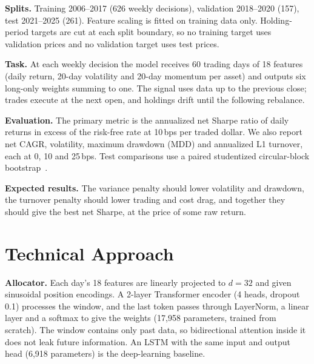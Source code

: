\documentclass[10pt,twocolumn,letterpaper]{article}
\begin{document}
\textbf{Splits.} Training 2006--2017 (626 weekly decisions), validation 2018--2020 (157), test
2021--2025 (261). Feature scaling is fitted on training data only. Holding-period targets are cut
at each split boundary, so no training target uses validation prices and no validation target
uses test prices.

\textbf{Task.} At each weekly decision the model receives 60 trading days of 18 features (daily
return, 20-day volatility and 20-day momentum per asset) and outputs six long-only weights
summing to one. The signal uses data up to the previous close; trades execute at the next
open, and holdings drift until the following rebalance.

\textbf{Evaluation.} The primary metric is the annualized net Sharpe ratio of daily returns in
excess of the risk-free rate at 10\,bps per traded dollar. We also report net CAGR, volatility,
maximum drawdown (MDD) and annualized L1 turnover, each at 0, 10 and 25\,bps. Test
comparisons use a paired studentized circular-block bootstrap~\cite{ledoit2008robust}.

\textbf{Expected results.} The variance penalty should lower volatility and drawdown, the
turnover penalty should lower trading and cost drag, and together they should give the best
net Sharpe, at the price of some raw return.

\section{Technical Approach}

\textbf{Allocator.} Each day's 18 features are linearly projected to $d=32$ and given
sinusoidal position encodings. A 2-layer Transformer encoder (4 heads, dropout 0.1) processes
the window, and the last token passes through LayerNorm, a linear layer and a softmax to give
the weights (17,958 parameters, trained from scratch). The window contains only past data, so
bidirectional attention inside it does not leak future information. An LSTM with the same input
and output head (6,918 parameters) is the deep-learning baseline.
\end{document}
